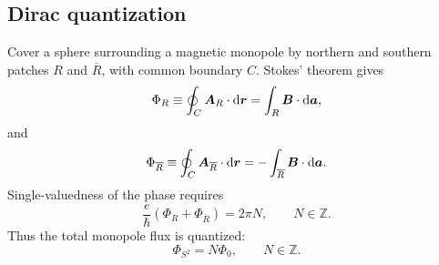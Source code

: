 \subsection{Dirac quantization}
Cover a sphere surrounding a magnetic monopole by northern and southern
patches $R$ and $\overline R$, with common boundary $C$. Stokes' theorem gives
\begin{equation}
 \Phi_R\equiv\oint_C\bm A_R\cdot\mathrm{d}\bm r
 =\int_R\bm B\cdot\mathrm{d}\bm a,
\end{equation}
and
\begin{equation}
\Phi_{\overline R}\equiv \oint_C\bm A_{\overline R}\cdot\mathrm{d}\bm r
 =-\int_{\overline R}\bm B\cdot\mathrm{d}\bm a.
\end{equation}
Single-valuedness of the phase requires
\begin{equation}
 \frac{e}{\hbar}
 \left(\Phi_R+\Phi_{\overline R}\right)
 =2\pi N,
 \qquad N\in\mathbb Z.
\end{equation}
Thus the total monopole flux is quantized:
\begin{equation}
 \boxed{
 \Phi_{S^2}=N\Phi_0,
 \qquad N\in\mathbb Z.}
\end{equation}